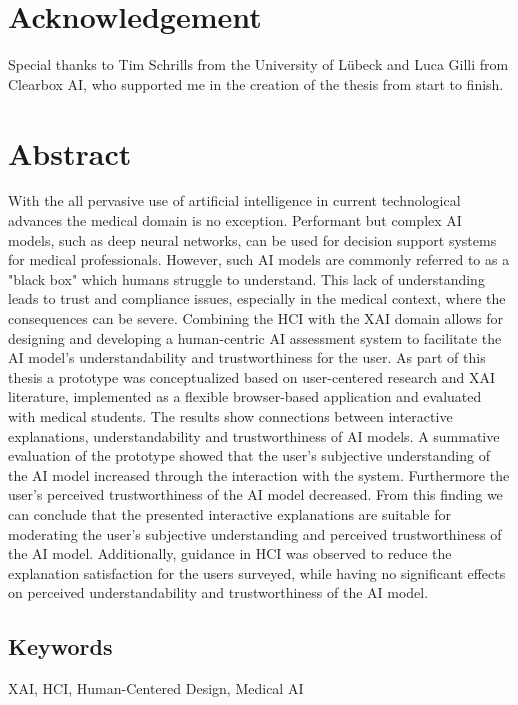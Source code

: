 \chapter*{Acknowledgement}
Special thanks to Tim Schrills from the University of Lübeck and Luca Gilli from\\ Clearbox AI, who supported me in the creation of the thesis from start to finish.

\newpage
\chapter*{Abstract}
With the all pervasive use of artificial intelligence in current technological advances the medical domain is no exception. Performant but complex AI models, such as deep neural networks, can be used for decision support systems for medical professionals. However, such AI models are commonly referred to as a "black box" which humans struggle to understand. This lack of understanding leads to trust and compliance issues, especially in the medical context, where the consequences can be severe. Combining the HCI with the XAI domain allows for designing and developing a human-centric AI assessment system to facilitate the AI model's understandability and trustworthiness for the user. As part of this thesis a prototype was conceptualized based on user-centered research and XAI literature, implemented as a flexible browser-based application and evaluated with medical students. The results show connections between interactive explanations, understandability and trustworthiness of AI models. A summative evaluation of the prototype showed that the user's subjective understanding of the AI model increased through the interaction with the system. Furthermore the user's perceived trustworthiness of the AI model decreased. From this finding we can conclude that the presented interactive explanations are suitable for moderating the user's subjective understanding and perceived trustworthiness of the AI model. Additionally, guidance in HCI was observed to reduce the explanation satisfaction for the users surveyed, while having no significant effects on perceived understandability and trustworthiness of the AI model.

\section*{Keywords}
XAI, HCI, Human-Centered Design, Medical AI

\newpage
